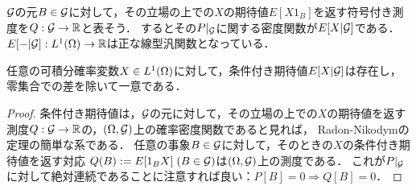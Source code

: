\documentclass[uplatex,dvipdfmx]{jsreport}
\begin{document}
\begin{tcolorbox}[colframe=ForestGreen, colback=ForestGreen!10!white,breakable,colbacktitle=ForestGreen!40!white,coltitle=black,fonttitle=\bfseries\sffamily,
title=]
    $\mathcal{G}$の元$B\in\mathcal{G}$に対して，その立場の上での$X$の期待値$E[X1_B]$を返す符号付き測度を$Q:\mathcal{G}\to\mathbb{R}$と表そう．
    するとその$P|_{\mathcal{G}}$に関する密度関数が$E[X|\mathcal{G}]$である．
    $E[-|\mathcal{G}]:L^1(\Omega)\to\mathbb{R}$は正な線型汎関数となっている．
\end{tcolorbox}

\begin{corollary}
    任意の可積分確率変数$X\in L^1(\Omega)$に対して，条件付き期待値$E[X|\mathcal{G}]$は存在し，零集合での差を除いて一意である．
\end{corollary}
\begin{proof}
    条件付き期待値は，$\mathcal{G}$の元に対して，その立場の上での$X$の期待値を返す測度$Q:\mathcal{G}\to\mathbb{R}$の，$(\Omega,\mathcal{G})$上の確率密度関数であると見れば，
    Radon-Nikodymの定理の簡単な系である．
    任意の事象$B\in\mathcal{G}$に対して，そのときの$X$の条件付き期待値を返す対応
    $Q(B):=E[1_BX]\;(B\in\mathcal{G})$は$(\Omega,\mathcal{G})$上の測度である．
    これが$P|_{\mathcal{G}}$に対して絶対連続であることに注意すれば良い：$P[B]=0\Rightarrow Q[B]=0$．
\end{proof}
\end{document}
